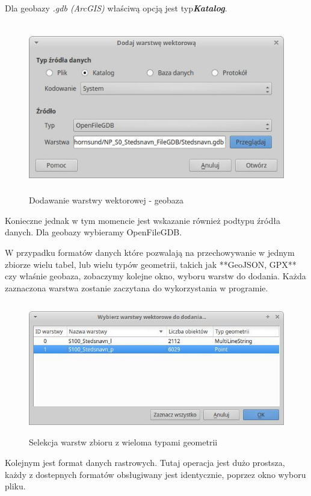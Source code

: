 \documentclass[12pt,a4paper]{book}
\begin{document}
Dla geobazy \textit{.gdb (ArcGIS)} właściwą opcją jest typ\textit{\textbf{Katalog}}.



\begin{center}
\begin{figure}
\includegraphics[width=13.335cm,height=7.437cm]{002-dodaj-ogdb.png}
\caption{Dodawanie warstwy wektorowej - geobaza}
\end{figure}
\end{center}
Konieczne jednak w tym momencie jest wskazanie również podtypu źródła danych. Dla geobazy wybieramy OpenFileGDB.

W przypadku formatów danych które pozwalają na przechowywanie w jednym zbiorze wielu tabel, lub wielu typów geometrii, takich jak **GeoJSON, GPX** czy właśnie geobaza, zobaczymy kolejne okno, wyboru warstw do dodania. Każda zaznaczona warstwa zostanie zaczytana do wykorzystania w programie.



\begin{center}
\begin{figure}
\includegraphics[width=13cm,height=5.779cm]{002-typ-geometrii.jpg}
\caption{Selekcja warstw zbioru z wieloma typami geometrii}
\end{figure}
\end{center}
Kolejnym jest format danych rastrowych. Tutaj operacja jest dużo prostsza, każdy z dostepnych formatów obsługiwany jest identycznie, poprzez okno wyboru pliku.
\end{document}
